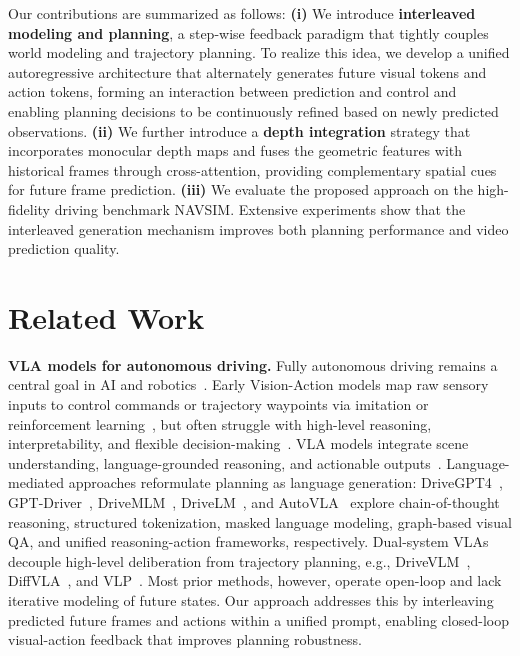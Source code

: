 \documentclass[runningheads]{llncs}
\begin{document}
Our contributions are summarized as follows:
{\bf (i)} We introduce \textbf{interleaved modeling and planning}, a step-wise feedback paradigm that tightly couples world modeling and trajectory planning. To realize this idea, we develop a unified autoregressive architecture that alternately generates future visual tokens and action tokens, forming an interaction between prediction and control and enabling planning decisions to be continuously refined based on newly predicted observations.
{\bf(ii)} We further introduce a \textbf{depth integration} strategy that incorporates monocular depth maps and fuses the geometric features with historical frames through cross-attention, providing complementary spatial cues for future frame prediction.
{\bf (iii)} We evaluate the proposed approach on the high-fidelity driving benchmark NAVSIM. Extensive experiments show that the interleaved generation mechanism improves both planning performance and video prediction quality.


\section{Related Work}
\label{sec:relatedwork}

\noindent\textbf{VLA models for autonomous driving.}
Fully autonomous driving remains a central goal in AI and robotics~\cite{chib2024e2eadsurvey,huThu2025visionlanguageactionmodelsautonomous}. Early Vision-Action models map raw sensory inputs to control commands or trajectory waypoints via imitation or reinforcement learning~\cite{chib2024e2eadsurvey,le2022survey,liang2018cirl}, but often struggle with high-level reasoning, interpretability, and flexible decision-making~\cite{Grigorescu2020survey, hu2023planningorientedautonomousdriving}. VLA models integrate scene understanding, language-grounded reasoning, and actionable outputs~\cite{kim2024openvlaopensourcevisionlanguageactionmodel,huThu2025visionlanguageactionmodelsautonomous}. Language-mediated approaches reformulate planning as language generation: DriveGPT4~\cite{xu2024drivegpt4interpretableendtoendautonomous}, GPT-Driver~\cite{mao2023gptdriverlearningdrivegpt}, DriveMLM~\cite{wang2023drivemlm}, DriveLM~\cite{sima2023drivelm}, and AutoVLA~\cite{zhou2025autovla} explore chain-of-thought reasoning, structured tokenization, masked language modeling, graph-based visual QA, and unified reasoning-action frameworks, respectively. Dual-system VLAs decouple high-level deliberation from trajectory planning, e.g., DriveVLM~\cite{tian2024drivevlm}, DiffVLA~\cite{jiang2025diffvla}, and VLP~\cite{pan2024vlp}. Most prior methods, however, operate open-loop and lack iterative modeling of future states. Our approach addresses this by interleaving predicted future frames and actions within a unified prompt, enabling closed-loop visual-action feedback that improves planning robustness.
\end{document}
